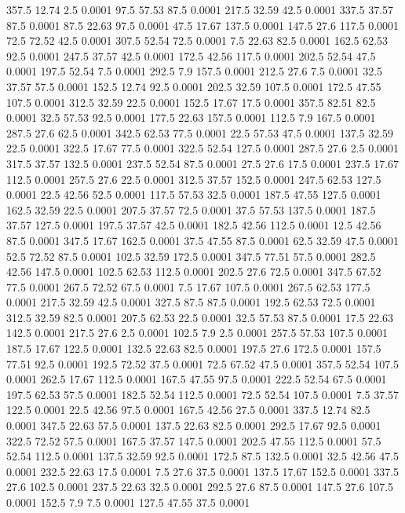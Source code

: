 357.5	12.74	2.5	0.0001
97.5	57.53	87.5	0.0001
217.5	32.59	42.5	0.0001
337.5	37.57	87.5	0.0001
87.5	22.63	97.5	0.0001
47.5	17.67	137.5	0.0001
147.5	27.6	117.5	0.0001
72.5	72.52	42.5	0.0001
307.5	52.54	72.5	0.0001
7.5	22.63	82.5	0.0001
162.5	62.53	92.5	0.0001
247.5	37.57	42.5	0.0001
172.5	42.56	117.5	0.0001
202.5	52.54	47.5	0.0001
197.5	52.54	7.5	0.0001
292.5	7.9	157.5	0.0001
212.5	27.6	7.5	0.0001
32.5	37.57	57.5	0.0001
152.5	12.74	92.5	0.0001
202.5	32.59	107.5	0.0001
172.5	47.55	107.5	0.0001
312.5	32.59	22.5	0.0001
152.5	17.67	17.5	0.0001
357.5	82.51	82.5	0.0001
32.5	57.53	92.5	0.0001
177.5	22.63	157.5	0.0001
112.5	7.9	167.5	0.0001
287.5	27.6	62.5	0.0001
342.5	62.53	77.5	0.0001
22.5	57.53	47.5	0.0001
137.5	32.59	22.5	0.0001
322.5	17.67	77.5	0.0001
322.5	52.54	127.5	0.0001
287.5	27.6	2.5	0.0001
317.5	37.57	132.5	0.0001
237.5	52.54	87.5	0.0001
27.5	27.6	17.5	0.0001
237.5	17.67	112.5	0.0001
257.5	27.6	22.5	0.0001
312.5	37.57	152.5	0.0001
247.5	62.53	127.5	0.0001
22.5	42.56	52.5	0.0001
117.5	57.53	32.5	0.0001
187.5	47.55	127.5	0.0001
162.5	32.59	22.5	0.0001
207.5	37.57	72.5	0.0001
37.5	57.53	137.5	0.0001
187.5	37.57	127.5	0.0001
197.5	37.57	42.5	0.0001
182.5	42.56	112.5	0.0001
12.5	42.56	87.5	0.0001
347.5	17.67	162.5	0.0001
37.5	47.55	87.5	0.0001
62.5	32.59	47.5	0.0001
52.5	72.52	87.5	0.0001
102.5	32.59	172.5	0.0001
347.5	77.51	57.5	0.0001
282.5	42.56	147.5	0.0001
102.5	62.53	112.5	0.0001
202.5	27.6	72.5	0.0001
347.5	67.52	77.5	0.0001
267.5	72.52	67.5	0.0001
7.5	17.67	107.5	0.0001
267.5	62.53	177.5	0.0001
217.5	32.59	42.5	0.0001
327.5	87.5	87.5	0.0001
192.5	62.53	72.5	0.0001
312.5	32.59	82.5	0.0001
207.5	62.53	22.5	0.0001
32.5	57.53	87.5	0.0001
17.5	22.63	142.5	0.0001
217.5	27.6	2.5	0.0001
102.5	7.9	2.5	0.0001
257.5	57.53	107.5	0.0001
187.5	17.67	122.5	0.0001
132.5	22.63	82.5	0.0001
197.5	27.6	172.5	0.0001
157.5	77.51	92.5	0.0001
192.5	72.52	37.5	0.0001
72.5	67.52	47.5	0.0001
357.5	52.54	107.5	0.0001
262.5	17.67	112.5	0.0001
167.5	47.55	97.5	0.0001
222.5	52.54	67.5	0.0001
197.5	62.53	57.5	0.0001
182.5	52.54	112.5	0.0001
72.5	52.54	107.5	0.0001
7.5	37.57	122.5	0.0001
22.5	42.56	97.5	0.0001
167.5	42.56	27.5	0.0001
337.5	12.74	82.5	0.0001
347.5	22.63	57.5	0.0001
137.5	22.63	82.5	0.0001
292.5	17.67	92.5	0.0001
322.5	72.52	57.5	0.0001
167.5	37.57	147.5	0.0001
202.5	47.55	112.5	0.0001
57.5	52.54	112.5	0.0001
137.5	32.59	92.5	0.0001
172.5	87.5	132.5	0.0001
32.5	42.56	47.5	0.0001
232.5	22.63	17.5	0.0001
7.5	27.6	37.5	0.0001
137.5	17.67	152.5	0.0001
337.5	27.6	102.5	0.0001
237.5	22.63	32.5	0.0001
292.5	27.6	87.5	0.0001
147.5	27.6	107.5	0.0001
152.5	7.9	7.5	0.0001
127.5	47.55	37.5	0.0001
